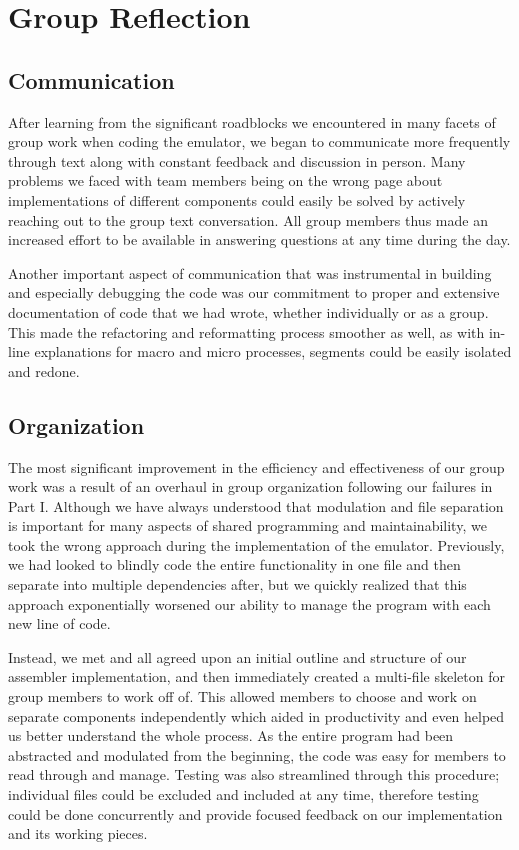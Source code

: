 \documentclass[11pt]{article}
\begin{document}
\section{Group Reflection}

\subsection{Communication}

After learning from the significant roadblocks we encountered in many facets of group work when 
coding the emulator, we began to communicate more frequently through text along with constant 
feedback and discussion in person. Many problems we faced with team members being on the wrong 
page about implementations of different components could easily be solved by actively 
reaching out to the group text conversation. All group members thus made an 
increased effort to be available in answering questions at any time during the day.

Another important aspect of communication that was instrumental in building and especially 
debugging the code was our commitment to proper and extensive documentation of code that we had 
wrote, whether individually or as a group. This made the refactoring and reformatting process 
smoother as well, as with in-line explanations for macro and micro processes, segments could be 
easily isolated and redone.

\subsection{Organization}

The most significant improvement in the efficiency and effectiveness of our group work was a 
result of an overhaul in group organization following our failures in Part I. Although we have 
always understood that modulation and file separation is important for many aspects of shared 
programming and maintainability, we took the wrong approach during the implementation of the 
emulator. Previously, we had looked to blindly code the entire functionality in one file and 
then separate into multiple dependencies after, but we quickly realized that this approach 
exponentially worsened our ability to manage the program with each new line of code.

Instead, we met and all agreed upon an initial outline and structure of our assembler 
implementation, and then immediately created a multi-file skeleton for group members to work 
off of. This allowed members to choose and work on separate components independently which 
aided in productivity and even helped us better understand the whole process. As the entire 
program had been abstracted and modulated from the beginning, the code was easy for members to 
read through and manage. Testing was also streamlined through this procedure; individual files 
could be excluded and included at any time, therefore testing could be done concurrently and 
provide focused feedback on our implementation and its working pieces.
\end{document}
